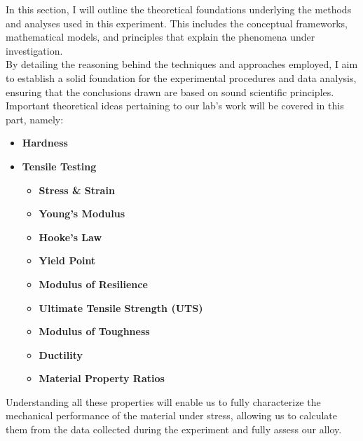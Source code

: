 \documentclass{article}
\begin{document}
    In this section, I will outline the theoretical foundations underlying the methods and analyses used in this experiment. This includes the conceptual frameworks, mathematical models, and principles that explain the phenomena under investigation.\\[8pt]
    By detailing the reasoning behind the techniques and approaches employed, I aim to establish a solid foundation for the experimental procedures and data analysis, ensuring that the conclusions drawn are based on sound scientific principles.\\[8pt]
    Important theoretical ideas pertaining to our lab's work will be covered in this part, namely:
    \begin{itemize}
        \item \textbf{Hardness}
        \item \textbf{Tensile Testing}
        \begin{itemize}
            \item \textbf{Stress \& Strain}
            \item \textbf{Young's Modulus}
            \item \textbf{Hooke's Law}
            \item \textbf{Yield Point}
            \item \textbf{Modulus of Resilience}
            \item \textbf{Ultimate Tensile Strength (UTS)}
            \item \textbf{Modulus of Toughness}
            \item \textbf{Ductility}
            \item \textbf{Material Property Ratios}
        \end{itemize}
    \end{itemize}
    Understanding all these properties will enable us to fully characterize the mechanical performance of the material under stress, allowing us to calculate them from the data collected during the experiment and fully assess our alloy.
    \newpage
\end{document}
